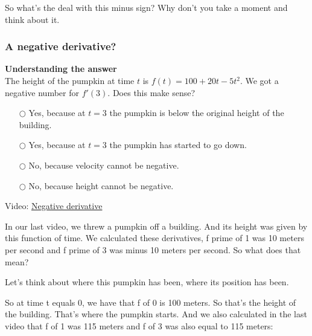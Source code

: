 \documentclass[pdftex, brazil, 12pt, twoside]{article}
\begin{document}
So what's the deal with this minus sign?
Why don't you take a moment and think about it.

\subsubsection{A negative derivative?}
\label{u1-what-negative-derivative}

\begin{exercise}
  \textbf{Understanding the answer}\\%
  The height of the pumpkin at time $t$ is
  $f(t) = 100+20t-5t^2$. We got a negative number for $f'(3)$. Does this make sense?
\begin{itemize}[noitemsep]
\item[$\bigcirc$] Yes, because at $t=3$ the pumpkin is below the original
  height of the building.
\item[$\bigcirc$] Yes, because at $t=3$ the pumpkin has started to go down.
\item[$\bigcirc$] No, because velocity cannot be negative.
\item[$\bigcirc$] No, because height cannot be negative. 
\end{itemize}
\end{exercise}

Video: \href{https://www.youtube.com/watch?v=qdvlaefmi7I}{Negative derivative}

In our last video, we threw a pumpkin off a building.
And its height was given by this function of time.
We calculated these derivatives, f prime of 1
was 10 meters per second and f prime of 3
was minus 10 meters per second.
So what does that mean?

\begin{figure}[H]
  \begin{center}
  \end{center}
\end{figure}

Let's think about where this pumpkin has been,
where its position has been.

So at time t equals 0, we have that f of 0 is 100 meters.
So that's the height of the building.
That's where the pumpkin starts.
And we also calculated in the last video that f of 1
was 115 meters and f of 3 was also equal to 115 meters:
\end{document}
